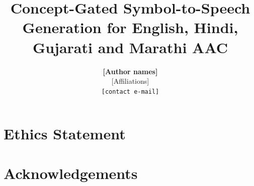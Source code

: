 \documentclass[11pt]{article}
\title{Concept-Gated Symbol-to-Speech Generation for English, Hindi, Gujarati and Marathi AAC}
\author{\textbf{{[Author names]}} \\
  {[Affiliations]} \\
  \texttt{{[contact e-mail]}}}
\begin{document}
\maketitle








\section*{Ethics Statement}


\section*{Acknowledgements}




\clearpage
\appendix

\end{document}
